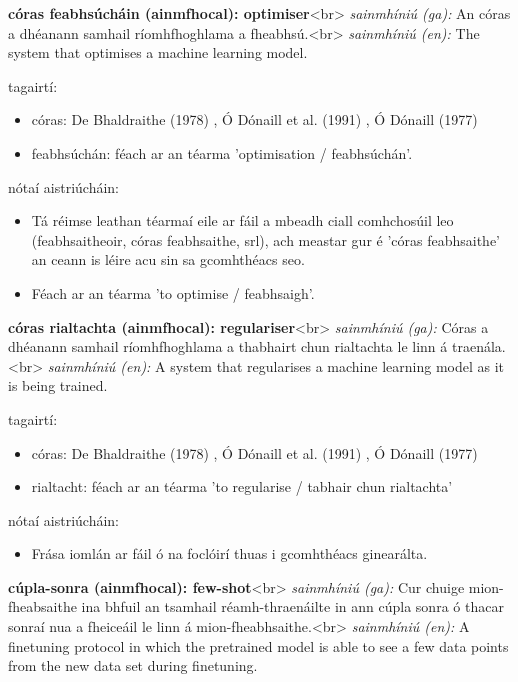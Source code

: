 \documentclass{article}
\begin{document}
\textbf{córas feabhsúcháin (ainmfhocal): optimiser}<br>
\textit{sainmhíniú (ga):} An córas a dhéanann samhail ríomhfhoghlama a fheabhsú.<br>
\textit{sainmhíniú (en):} The system that optimises a machine learning model.

tagairtí:
\begin{itemize}
	\item córas: De Bhaldraithe (1978) \cite{de-bhaldraithe}, Ó Dónaill et al. (1991) \cite{focloir-beag}, Ó Dónaill (1977) \cite{odonaill}
	\item feabhsúchán: féach ar an téarma 'optimisation / feabhsúchán'.
\end{itemize}

nótaí aistriúcháin:
\begin{itemize}
	\item Tá réimse leathan téarmaí eile ar fáil a mbeadh ciall comhchosúil leo (feabhsaitheoir, córas feabhsaithe, srl), ach meastar gur é 'córas feabhsaithe' an ceann is léire acu sin sa gcomhthéacs seo.
	\item Féach ar an téarma 'to optimise / feabhsaigh'.
\end{itemize}


\textbf{córas rialtachta (ainmfhocal): regulariser}<br>
\textit{sainmhíniú (ga):} Córas a dhéanann samhail ríomhfhoghlama a thabhairt chun rialtachta le linn á traenála.<br>
\textit{sainmhíniú (en):} A system that regularises a machine learning model as it is being trained.

tagairtí:
\begin{itemize}
	\item córas: De Bhaldraithe (1978) \cite{de-bhaldraithe}, Ó Dónaill et al. (1991) \cite{focloir-beag}, Ó Dónaill (1977) \cite{odonaill}
	\item rialtacht: féach ar an téarma 'to regularise / tabhair chun rialtachta'
\end{itemize}

nótaí aistriúcháin:
\begin{itemize}
	\item Frása iomlán ar fáil ó na foclóirí thuas i gcomhthéacs ginearálta.
\end{itemize}


\textbf{cúpla-sonra (ainmfhocal): few-shot}<br>
\textit{sainmhíniú (ga):} Cur chuige mion-fheabsaithe ina bhfuil an tsamhail réamh-thraenáilte in ann cúpla sonra ó thacar sonraí nua a fheiceáil le linn á mion-fheabhsaithe.<br>
\textit{sainmhíniú (en):} A finetuning protocol in which the pretrained model is able to see a few data points from the new data set during finetuning.
\end{document}
